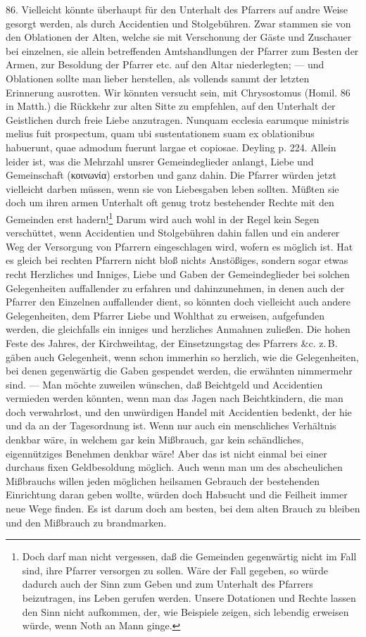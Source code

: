86. Vielleicht könnte überhaupt für den Unterhalt des Pfarrers auf andre Weise gesorgt werden, als durch Accidentien und Stolgebühren. Zwar stammen sie von den Oblationen der Alten, welche sie mit Verschonung der Gäste und Zuschauer bei einzelnen, sie allein betreffenden Amtshandlungen der Pfarrer zum Besten der Armen, zur Besoldung der Pfarrer etc. auf den Altar niederlegten; — und Oblationen sollte man lieber herstellen, als vollends sammt der letzten Erinnerung ausrotten. Wir könnten versucht sein, mit Chrysostomus (Homil. 86 in Matth.) die Rückkehr zur alten Sitte zu empfehlen, auf den Unterhalt der Geistlichen durch freie Liebe anzutragen. Nunquam ecclesia earumque ministris melius fuit prospectum, quam ubi sustentationem suam ex oblationibus habuerunt, quae admodum fuerunt largae et copiosae. Deyling p. 224. Allein leider ist, was die Mehrzahl unsrer Gemeindeglieder anlangt, Liebe und Gemeinschaft (κοινωνία) erstorben und ganz dahin. Die Pfarrer würden jetzt vielleicht darben müssen, wenn sie von Liebesgaben leben sollten. Müßten sie doch um ihren armen Unterhalt oft genug trotz bestehender Rechte mit den Gemeinden erst hadern!\footnote{Doch darf man nicht vergessen, daß die Gemeinden gegenwärtig nicht im Fall sind, ihre Pfarrer versorgen zu sollen. Wäre der Fall gegeben, so würde dadurch auch der Sinn zum Geben und zum Unterhalt des Pfarrers beizutragen, ins Leben gerufen werden. Unsere Dotationen und Rechte lassen den Sinn nicht aufkommen, der, wie Beispiele zeigen, sich lebendig erweisen würde, wenn Noth an Mann ginge.} Darum
wird auch wohl in der Regel kein Segen verschüttet, wenn Accidentien und Stolgebühren dahin fallen und ein anderer Weg der Versorgung von Pfarrern eingeschlagen wird, wofern es möglich ist. Hat es gleich bei rechten Pfarrern nicht bloß nichts Anstößiges, sondern sogar etwas recht Herzliches und Inniges, Liebe und Gaben der Gemeindeglieder bei solchen Gelegenheiten auffallender zu erfahren und dahinzunehmen, in denen auch der Pfarrer den Einzelnen auffallender dient, so könnten doch vielleicht auch andere Gelegenheiten, dem Pfarrer Liebe und Wohlthat zu erweisen, aufgefunden werden, die gleichfalls ein inniges und herzliches Anmahnen zuließen. Die hohen Feste des Jahres, der Kirchweihtag, der Einsetzungstag des Pfarrers \&c. z.\,B. gäben auch Gelegenheit, wenn schon immerhin so herzlich, wie die Gelegenheiten, bei denen gegenwärtig die Gaben gespendet werden, die erwähnten nimmermehr sind. — Man möchte zuweilen wünschen, daß Beichtgeld und Accidentien vermieden werden könnten, wenn man das Jagen nach Beichtkindern, die man doch verwahrlost, und den unwürdigen Handel mit Accidentien bedenkt, der hie und da an der Tagesordnung ist. Wenn nur auch ein menschliches Verhältnis denkbar wäre, in welchem gar kein Mißbrauch, gar kein schändliches, eigennütziges Benehmen denkbar wäre! Aber das ist nicht einmal bei einer durchaus fixen Geldbesoldung möglich. Auch wenn man um des abscheulichen Mißbrauchs willen jeden
möglichen heilsamen Gebrauch der bestehenden Einrichtung daran geben wollte, würden doch Habsucht und die Feilheit immer neue Wege finden. Es ist darum doch am besten, bei dem alten Brauch zu bleiben und den Mißbrauch zu brandmarken.

